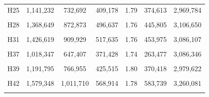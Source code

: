 \documentclass[
  a4paper,
  titlepage]{article}
\begin{document}
\begin{longtable}[t]{ccccccc}
H25 & 1,141,232 & 732,692 & 409,178 & 1.79 & 374,613 & 2,969,784\\
 
\cellcolor{gray!6}{H26} & \cellcolor{gray!6}{1,262,333} & \cellcolor{gray!6}{807,440} & \cellcolor{gray!6}{455,593} & \cellcolor{gray!6}{1.77} & \cellcolor{gray!6}{384,535} & \cellcolor{gray!6}{3,027,133}\\
 
H28 & 1,368,649 & 872,873 & 496,637 & 1.76 & 445,805 & 3,106,650\\
 
\cellcolor{gray!6}{H30} & \cellcolor{gray!6}{1,488,511} & \cellcolor{gray!6}{956,942} & \cellcolor{gray!6}{532,647} & \cellcolor{gray!6}{1.80} & \cellcolor{gray!6}{499,954} & \cellcolor{gray!6}{3,142,562}\\
 
H31 & 1,426,619 & 909,929 & 517,635 & 1.76 & 453,975 & 3,086,107\\
 
\cellcolor{gray!6}{H36} & \cellcolor{gray!6}{1,487,803} & \cellcolor{gray!6}{951,111} & \cellcolor{gray!6}{537,816} & \cellcolor{gray!6}{1.77} & \cellcolor{gray!6}{528,896} & \cellcolor{gray!6}{3,352,036}\\
 
H37 & 1,018,347 & 647,407 & 371,428 & 1.74 & 263,477 & 3,086,346\\
 
\cellcolor{gray!6}{H38} & \cellcolor{gray!6}{1,510,892} & \cellcolor{gray!6}{963,181} & \cellcolor{gray!6}{548,726} & \cellcolor{gray!6}{1.76} & \cellcolor{gray!6}{464,098} & \cellcolor{gray!6}{3,153,614}\\
 
H39 & 1,191,795 & 766,955 & 425,515 & 1.80 & 370,418 & 2,979,622\\
 
\cellcolor{gray!6}{H41} & \cellcolor{gray!6}{1,618,262} & \cellcolor{gray!6}{1,037,306} & \cellcolor{gray!6}{582,214} & \cellcolor{gray!6}{1.78} & \cellcolor{gray!6}{618,248} & \cellcolor{gray!6}{3,281,891}\\
 
H42 & 1,579,348 & 1,011,710 & 568,914 & 1.78 & 583,739 & 3,260,081\\
 
\cellcolor{gray!6}{H43} & \cellcolor{gray!6}{1,231,572} & \cellcolor{gray!6}{793,820} & \cellcolor{gray!6}{438,423} & \cellcolor{gray!6}{1.81} & \cellcolor{gray!6}{437,274} & \cellcolor{gray!6}{3,055,995}\\
 

\end{longtable}
\end{document}
